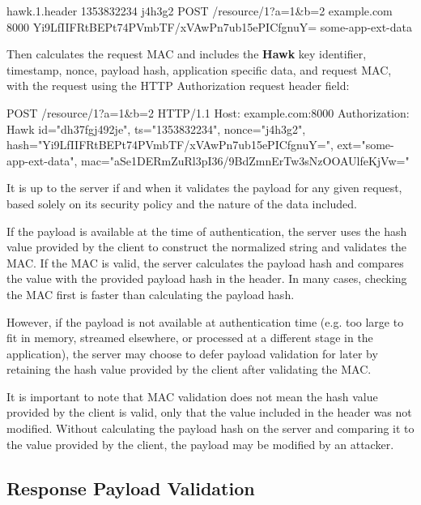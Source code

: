 \begin{DoxyCode}
hawk.1.header
1353832234
j4h3g2
POST
/resource/1?a=1&b=2
example.com
8000
Yi9LfIIFRtBEPt74PVmbTF/xVAwPn7ub15ePICfgnuY=
some-app-ext-data
\end{DoxyCode}


Then calculates the request M\+AC and includes the {\bfseries Hawk} key identifier, timestamp, nonce, payload hash, application specific data, and request M\+AC, with the request using the H\+T\+TP {\ttfamily Authorization} request header field\+:


\begin{DoxyCode}
POST /resource/1?a=1&b=2 HTTP/1.1
Host: example.com:8000
Authorization: Hawk id="dh37fgj492je", ts="1353832234", nonce="j4h3g2",
       hash="Yi9LfIIFRtBEPt74PVmbTF/xVAwPn7ub15ePICfgnuY=", ext="some-app-ext-data", mac="aSe1DERmZuRl3pI36/9BdZmnErTw3sNzOOAUlfeKjVw="
\end{DoxyCode}


It is up to the server if and when it validates the payload for any given request, based solely on it\textquotesingle{}s security policy and the nature of the data included.

If the payload is available at the time of authentication, the server uses the hash value provided by the client to construct the normalized string and validates the M\+AC. If the M\+AC is valid, the server calculates the payload hash and compares the value with the provided payload hash in the header. In many cases, checking the M\+AC first is faster than calculating the payload hash.

However, if the payload is not available at authentication time (e.\+g. too large to fit in memory, streamed elsewhere, or processed at a different stage in the application), the server may choose to defer payload validation for later by retaining the hash value provided by the client after validating the M\+AC.

It is important to note that M\+AC validation does not mean the hash value provided by the client is valid, only that the value included in the header was not modified. Without calculating the payload hash on the server and comparing it to the value provided by the client, the payload may be modified by an attacker.

\subsection*{Response Payload Validation}

